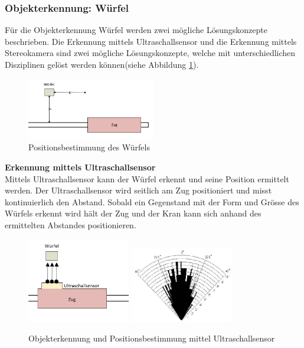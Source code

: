 \documentclass[../../main.tex]{subfiles}
\begin{document}
    \subsubsection{Objekterkennung: Würfel}
    Für die Objekterkennung Würfel werden zwei mögliche Lösungskonzepte beschrieben. Die Erkennung mittels Ultraschallsensor und die Erkennung mittels Stereokamera sind zwei mögliche Lösungskonzepte, welche mit unterschiedlichen Disziplinen gelöst werden können(siehe Abbildung \ref{fig:wurfelerkennung}).
    \begin{figure}[H] %
        \centering
        \includegraphics[width=0.5\textwidth]{wurfelerkennung.png}
        \caption{Positionsbestimmung des Würfels}
        \label{fig:wurfelerkennung}
    \end{figure}

    \textbf{Erkennung mittels Ultraschallsensor}\\
    Mittels Ultraschallsensor kann der Würfel erkennt und seine Position ermittelt werden. Der Ultraschallsensor
    wird seitlich am Zug positioniert und misst kontinuierlich den Abstand. Sobald ein Gegenstand mit der Form und
    Grösse des Würfels erkennt wird hält der Zug und der Kran kann sich anhand des ermittelten Abstandes 
    positionieren.
    \begin{figure}[H] %
        \centering
        \includegraphics[width=0.4\textwidth]{Ultraschallsensor.png}
        \includegraphics[width=0.4\textwidth]{Ultraschallsensor_angle.png}
        \caption{Objekterkennung und Positionsbestimmung mittel Ultraschallsensor}
        \label{fig:wurfel_ultraschall}
    \end{figure}
\end{document}
